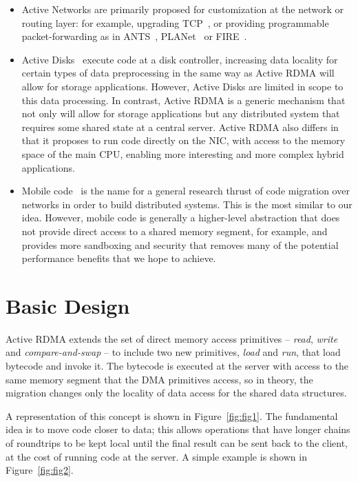 \documentclass[10pt]{article}
\begin{document}
\begin{itemize} \itemsep -2pt

\item Active Networks are primarily proposed for customization at the
  network or routing layer: for example, upgrading TCP~\cite{AN-tcp},
  or providing programmable packet-forwarding as in ANTS~\cite{ANTS},
  PLANet~\cite{planet} or FIRE~\cite{FIRE}.

\item Active Disks~\cite{AD2,AD} execute code at a disk controller,
  increasing data locality for certain types of data preprocessing in
  the same way as Active RDMA will allow for storage applications.
  However, Active Disks are limited in scope to this data processing.
  In contrast, Active RDMA is a generic mechanism that not only will
  allow for storage applications but any distributed system that
  requires some shared state at a central server. Active RDMA also
  differs in that it proposes to run code directly on the NIC, with
  access to the memory space of the main CPU, enabling more
  interesting and more complex hybrid applications.

\item Mobile code~\cite{mobile} is the name for a general research
  thrust of code migration over networks in order to build distributed
  systems. This is the most similar to our idea. However, mobile code
  is generally a higher-level abstraction that does not provide direct
  access to a shared memory segment, for example, and provides more
  sandboxing and security that removes many of the potential
  performance benefits that we hope to achieve.

\end{itemize}

\section{Basic Design}

Active RDMA extends the set of direct memory access primitives --
\emph{read}, \emph{write} and \emph{compare-and-swap} -- to include
two new primitives, \emph{load} and \emph{run}, that load bytecode and
invoke it. The bytecode is executed at the server with access to the
same memory segment that the DMA primitives access, so in theory, the
migration changes only the locality of data access for the shared data
structures.

A representation of this concept is shown in
Figure~\ref{fig:fig1}. The fundamental idea is to move code closer to
data; this allows operations that have longer chains of roundtrips to
be kept local until the final result can be sent back to the client,
at the cost of running code at the server. A simple example is shown
in Figure~\ref{fig:fig2}.
\end{document}
